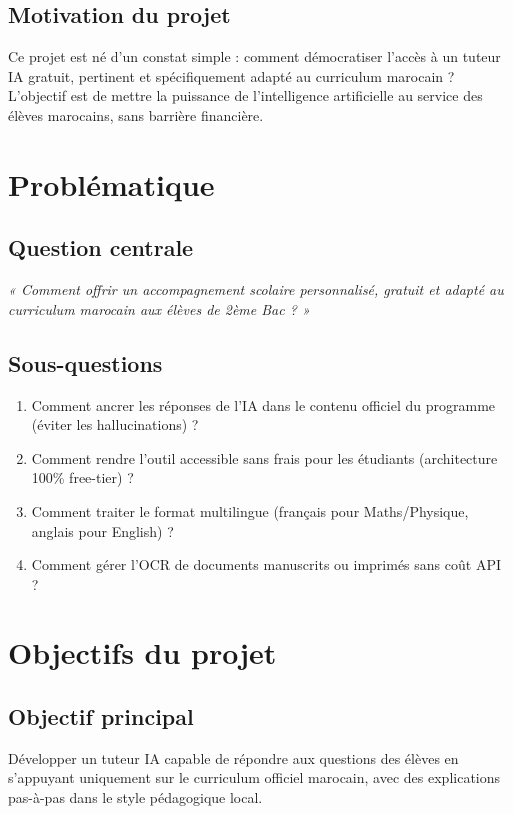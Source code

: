 \documentclass[12pt,a4paper]{report}
\begin{document}
\subsection{Motivation du projet}
Ce projet est né d'un constat simple : comment démocratiser l'accès à un tuteur IA gratuit, pertinent et spécifiquement adapté au curriculum marocain ? L'objectif est de mettre la puissance de l'intelligence artificielle au service des élèves marocains, sans barrière financière.

\section{Problématique}

\subsection{Question centrale}
\textit{« Comment offrir un accompagnement scolaire personnalisé, gratuit et adapté au curriculum marocain aux élèves de 2ème Bac ? »}

\subsection{Sous-questions}
\begin{enumerate}
    \item Comment ancrer les réponses de l'IA dans le contenu officiel du programme (éviter les hallucinations) ?
    \item Comment rendre l'outil accessible sans frais pour les étudiants (architecture 100\% free-tier) ?
    \item Comment traiter le format multilingue (français pour Maths/Physique, anglais pour English) ?
    \item Comment gérer l'OCR de documents manuscrits ou imprimés sans coût API ?
\end{enumerate}

\section{Objectifs du projet}

\subsection{Objectif principal}
Développer un tuteur IA capable de répondre aux questions des élèves en s'appuyant uniquement sur le curriculum officiel marocain, avec des explications pas-à-pas dans le style pédagogique local.
\end{document}

